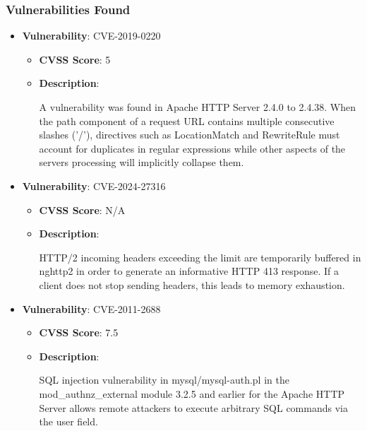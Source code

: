 \documentclass{article}
\begin{document}
\subsubsection*{Vulnerabilities Found}

\begin{itemize}
    
        \item \textbf{Vulnerability}: CVE-2019-0220
        \begin{itemize}
            \item \textbf{CVSS Score}:  5 
            \item \textbf{Description}:
            \parbox[t]{0.9\linewidth}{
                \ttfamily A vulnerability was found in Apache HTTP Server 2.4.0 to 2.4.38. When the path component of a request URL contains multiple consecutive slashes ('/'), directives such as LocationMatch and RewriteRule must account for duplicates in regular expressions while other aspects of the servers processing will implicitly collapse them.
            }
        \end{itemize}
    
        \item \textbf{Vulnerability}: CVE-2024-27316
        \begin{itemize}
            \item \textbf{CVSS Score}:  N/A 
            \item \textbf{Description}:
            \parbox[t]{0.9\linewidth}{
                \ttfamily HTTP/2 incoming headers exceeding the limit are temporarily buffered in nghttp2 in order to generate an informative HTTP 413 response. If a client does not stop sending headers, this leads to memory exhaustion.
            }
        \end{itemize}
    
        \item \textbf{Vulnerability}: CVE-2011-2688
        \begin{itemize}
            \item \textbf{CVSS Score}:  7.5 
            \item \textbf{Description}:
            \parbox[t]{0.9\linewidth}{
                \ttfamily SQL injection vulnerability in mysql/mysql-auth.pl in the mod\_authnz\_external module 3.2.5 and earlier for the Apache HTTP Server allows remote attackers to execute arbitrary SQL commands via the user field.
            }
        \end{itemize}
    

\end{itemize}
\end{document}
